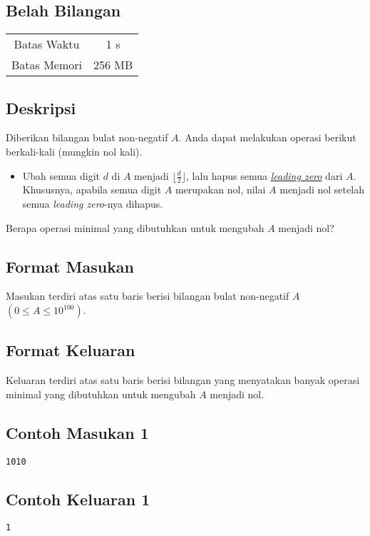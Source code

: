 \documentclass{article}
\begin{document}
\begin{center}
    \section*{Belah Bilangan} %

    \begin{tabular}{ | c c | }
        \hline
        Batas Waktu  & 1 s \\    %
        Batas Memori & 256 MB \\  %
        \hline
    \end{tabular}
\end{center}

\subsection*{Deskripsi}
Diberikan bilangan bulat non-negatif $A$. Anda dapat melakukan operasi berikut berkali-kali (mungkin nol kali).

\begin{itemize}
    \item Ubah semua digit $d$ di $A$ menjadi $\lfloor \frac{d}{2} \rfloor$, lalu hapus semua \href{https://en.wikipedia.org/wiki/Leading_zero}{\textit{leading zero}} dari $A$. Khususnya, apabila semua digit $A$ merupakan nol, nilai $A$ menjadi nol setelah semua \textit{leading zero}-nya dihapus.
\end{itemize}

Berapa operasi minimal yang dibutuhkan untuk mengubah $A$ menjadi nol?

\subsection*{Format Masukan}
Masukan terdiri atas satu baris berisi bilangan bulat non-negatif $A$ $(0 \leq A \leq 10^{100})$.

\subsection*{Format Keluaran}
Keluaran terdiri atas satu baris berisi bilangan yang menyatakan banyak operasi minimal yang dibutuhkan untuk mengubah $A$ menjadi nol.

\begin{multicols}{2}
\subsection*{Contoh Masukan 1}
\begin{lstlisting}
1010
\end{lstlisting}
\null
\columnbreak
\subsection*{Contoh Keluaran 1}
\begin{lstlisting}
1
\end{lstlisting}
\vfill
\null
\end{multicols}
\end{document}
